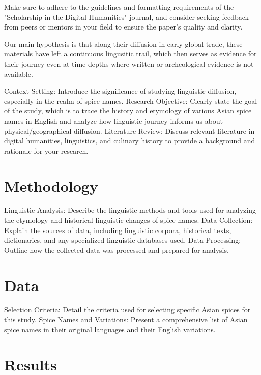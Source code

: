 \documentclass[12pt]{article}
\begin{document}
Make sure to adhere to the guidelines and formatting requirements of the "Scholarship in the Digital Humanities" journal, and consider seeking feedback from peers or mentors in your field to ensure the paper's quality and clarity.










Our main hypothesis is that along their diffusion in early global trade, these materials have left a continuous lingusitic trail, which then serves as evidence for their journey even at time-depths where written or archeological evidence is not available.



Context Setting: Introduce the significance of studying linguistic diffusion, especially in the realm of spice names.
Research Objective: Clearly state the goal of the study, which is to trace the history and etymology of various Asian spice names in English and analyze how linguistic journey informs us about physical/geographical diffusion.
Literature Review: Discuss relevant literature in digital humanities, linguistics, and culinary history to provide a background and rationale for your research.

\section{Methodology}

Linguistic Analysis: Describe the linguistic methods and tools used for analyzing the etymology and historical linguistic changes of spice names.
Data Collection: Explain the sources of data, including linguistic corpora, historical texts, dictionaries, and any specialized linguistic databases used.
Data Processing: Outline how the collected data was processed and prepared for analysis.

\section{Data}

Selection Criteria: Detail the criteria used for selecting specific Asian spices for this study.
Spice Names and Variations: Present a comprehensive list of Asian spice names in their original languages and their English variations.

\section{Results}
\end{document}
